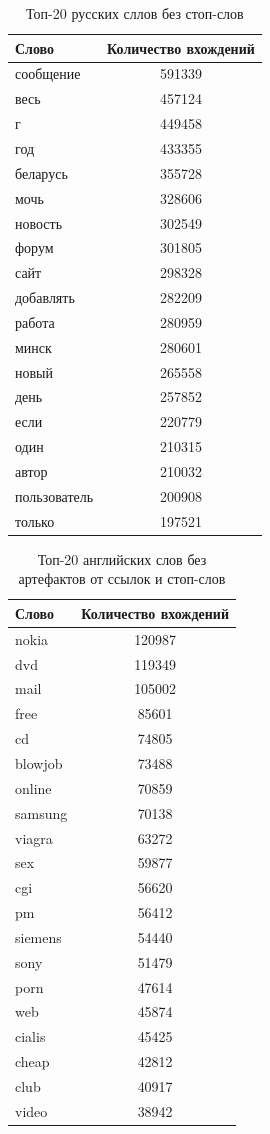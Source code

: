 \begin{table}
	\begin{center}
		\begin{tabular}{|l|c|}
			\hline
			Слово & Количество вхождений\\
			\hline
			сообщение& 591339 \\
			весь &457124 \\
			г &449458\\
			год& 433355\\
			беларусь &355728\\
			мочь &328606\\
			новость& 302549\\
			форум &301805\\
			сайт &298328\\
			добавлять &282209\\
			работа &280959\\
			минск &280601\\
			новый &265558\\
			день &257852\\
			если &220779\\
			один &210315\\
			автор &210032\\
			пользователь &200908\\
			только &197521\\
			\hline
		\end{tabular}
	\end{center}
	\caption{Топ-20 русских сллов без стоп-слов}
\end{table}

\begin{table}
	\begin{center}
		\begin{tabular}{|l|c|}
			\hline
			Слово & Количество вхождений\\
			\hline
			nokia & 120987\\
			dvd & 119349\\
			mail & 105002\\
			free & 85601\\
			cd & 74805\\
			blowjob & 73488\\
			online & 70859\\
			samsung & 70138\\
			viagra & 63272\\
			sex & 59877\\
			cgi & 56620\\
			pm & 56412\\
			siemens & 54440\\
			sony & 51479\\
			porn & 47614\\
			web & 45874\\
			cialis & 45425\\
			cheap & 42812\\
			club & 40917\\
			video & 38942\\
			\hline
		\end{tabular}
	\end{center}
	\caption{Топ-20 английских слов без артефактов от ссылок и стоп-слов}
\end{table}


